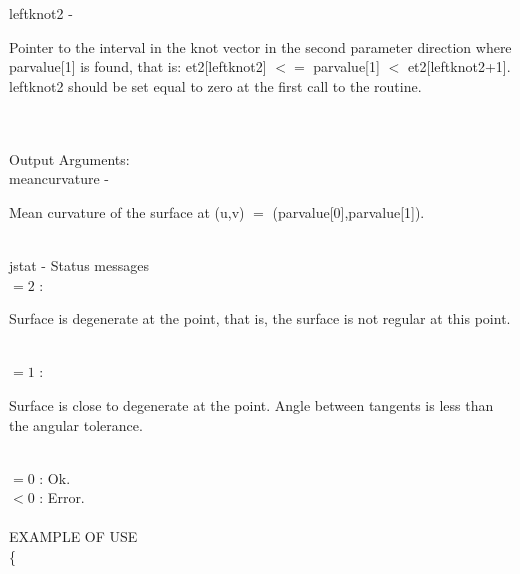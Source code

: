         \>\>    {\fov leftknot2}\> - \>  \begin{minipg2}
                     Pointer to the interval in the knot vector in the
                     second parameter direction where parvalue[1] is found,
                     that is:
                          et2[leftknot2] $<=$ parvalue[1] $<$ et2[leftknot2+1].
                     leftknot2 should be set equal to zero at the first call
                     to the routine.
                               \end{minipg2}\\[0.8ex]
\\
	\>Output Arguments:\\
        \>\>    {\fov meancurvature}\> - \>  \begin{minipg2}
                     Mean curvature of the surface at (u,v) $=$
                     (parvalue[0],parvalue[1]).
                               \end{minipg2}\\
        \>\>    {\fov jstat}     \> - \> Status messages\\
                \>\>\>\> $= 2$ : 
                       \> \begin{minipg5}  
                               Surface is degenerate at the point, that is,
                               the surface is not regular at this point.
                               \end{minipg5}\\[0.8ex]
                \>\>\>\>  $= 1$ :
                       \> \begin{minipg5}  
                               Surface is close to degenerate at the point.
                               Angle between tangents is less than the angular
                               tolerance.
                               \end{minipg5}\\[0.8ex]
                \>\>\>\> $= 0$ : \> Ok.\\
                \>\>\>\> $< 0$ : \> Error.\\
\\
EXAMPLE OF USE\\
		\>      \{ \\

